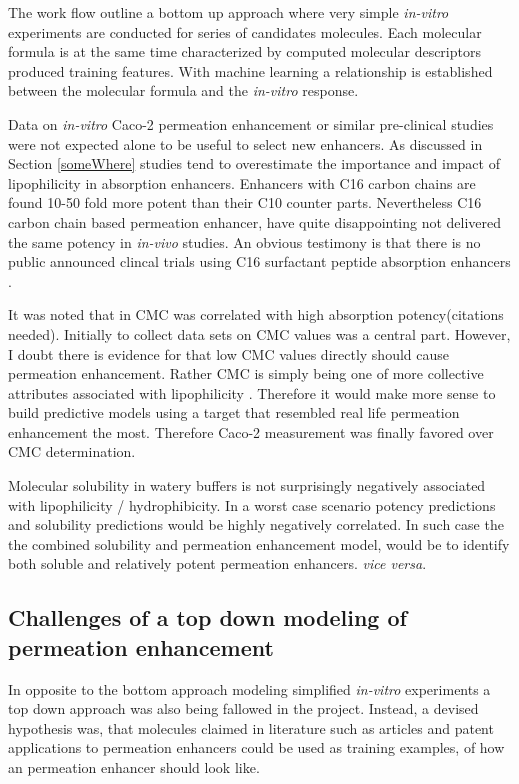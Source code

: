 The work flow outline a bottom up approach where very simple \textit{in-vitro} experiments are conducted for series of candidates molecules. Each molecular formula is at the same time characterized by computed molecular descriptors  produced training features. With machine learning a relationship is established between the molecular formula and the \textit{in-vitro} response.

Data on \textit{in-vitro} Caco-2 permeation enhancement or similar pre-clinical studies were not expected alone to be useful to select new enhancers. As discussed in Section \ref{someWhere}  studies tend to overestimate the importance and impact of lipophilicity in absorption enhancers. Enhancers with C16 carbon chains are found 10-50 fold more potent than their C10 counter parts. Nevertheless C16 carbon chain based permeation enhancer, have quite disappointing not delivered the same potency in \textit{in-vivo} studies. An obvious testimony is that there is no public announced clincal trials using C16 surfactant peptide absorption enhancers \cite{aguirre2016current}.

It was noted that in CMC was correlated with high absorption potency(citations needed). Initially to collect data sets on CMC values was a central part. However,  I doubt there is evidence for that low CMC values directly should cause permeation enhancement. Rather CMC is simply being one of more collective attributes associated with lipophilicity \cite{rosen2012surfactants}. Therefore it would make more sense to build predictive models using a target that resembled real life permeation enhancement the most. Therefore Caco-2 measurement was finally favored over CMC determination.

Molecular solubility in watery buffers is not surprisingly negatively associated with lipophilicity / hydrophibicity. In a worst case scenario potency predictions and solubility predictions would be highly negatively correlated. In such case the the combined solubility and permeation enhancement model, would be to identify both soluble and relatively potent permeation enhancers. \textit{vice versa}.

\subsection{Challenges of a top down modeling of permeation enhancement}
In opposite to the bottom approach modeling simplified \textit{in-vitro} experiments a top down approach was also being fallowed in the project. Instead,
a devised hypothesis was, that molecules claimed in literature such as articles and patent applications to permeation enhancers could be used as training examples, of how an permeation enhancer should look like.

